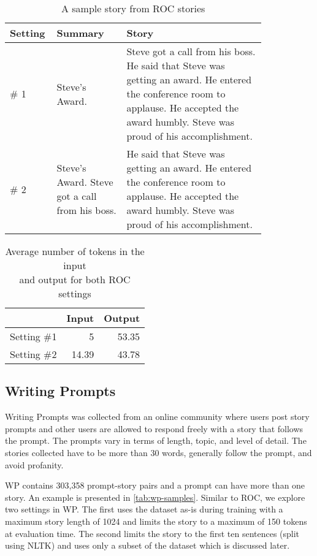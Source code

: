\begin{table}[ht]
\centering
\begin{tabular}{p{0.08\linewidth} | p{0.25\linewidth} | p{0.5\linewidth}}
Setting & Summary  & Story \\ \hline
\# 1 & Steve's Award. & Steve got a call from his boss. He said that Steve was getting an award. He entered the conference room to applause. He accepted the award humbly. Steve was proud of his accomplishment. \\ \hline
      
\# 2 & Steve's Award. Steve got a call from his boss. & He said that Steve was getting an award. He entered the conference room to applause. He accepted the award humbly. Steve was proud of his accomplishment. \\
\end{tabular}
\caption{A sample story from ROC stories%
}
\label{tab:roc-samples}
\end{table}

\begin{table}[ht]
\centering
\begin{tabular}{l|rr}

            & Input & Output \\ \hline
Setting \#1 & 5     & 53.35  \\
Setting \#2 & 14.39 & 43.78 \\
\end{tabular}
\caption{Average number of tokens in the input \\ and output for both ROC settings}
\label{tab:roc-statistics}
\end{table}


\subsection{Writing Prompts}
\label{sec:writing_prompts}

Writing Prompts \cite[WP]{fan2018hierarchical} was collected from an online community where users post story prompts and other users are allowed to respond freely with a story that follows the prompt. The prompts vary in terms of length, topic, and level of detail. The stories collected have to be more than 30 words, generally follow the prompt, and avoid profanity.

WP contains 303,358 prompt-story pairs and a prompt can have more than one story. An example is presented in \cref{tab:wp-samples}. Similar to ROC, we explore two settings in WP. The first uses the dataset as-is during training with a maximum story length of 1024 and limits the story to a maximum of 150 tokens at evaluation time. The second limits the story to the first ten sentences (split using NLTK) and uses only a subset of the dataset which is discussed later.


